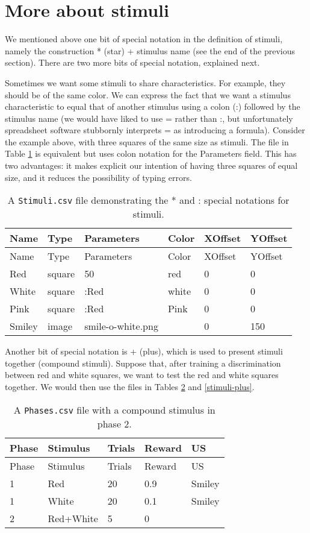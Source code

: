 \documentclass[11pt,]{article}
\begin{document}
\section{More about stimuli}\label{more-about-stimuli}

We mentioned above one bit of special notation in the definition of
stimuli, namely the construction * (star) + stimulus name (see the end
of the previous section). There are two more bits of special notation,
explained next.

Sometimes we want some stimuli to share characteristics. For example,
they should be of the same color. We can express the fact that we want a
stimulus characteristic to equal that of another stimulus using a colon
(:) followed by the stimulus name (we would have liked to use = rather
than :, but unfortunately spreadsheet software stubbornly interprets =
as introducing a formula). Consider the example above, with three
squares of the same size as stimuli. The file in Table
\ref{stimuli-special} is equivalent but uses colon notation for the
Parameters field. This has two advantages: it makes explicit our
intention of having three squares of equal size, and it reduces the
possibility of typing errors.

\begin{longtable}[c]{@{}llllll@{}}
\caption{A \texttt{Stimuli.csv} file demonstrating the * and : special
notations for stimuli. \label{stimuli-special}}\tabularnewline
\toprule
Name & Type & Parameters & Color & XOffset & YOffset\tabularnewline
\midrule
\endfirsthead
\toprule
Name & Type & Parameters & Color & XOffset & YOffset\tabularnewline
\midrule
\endhead
Red & square & 50 & red & 0 & 0\tabularnewline
White & square & :Red & white & 0 & 0\tabularnewline
Pink & square & :Red & Pink & 0 & 0\tabularnewline
Smiley & image & smile-o-white.png & & 0 & 150\tabularnewline
\bottomrule
\end{longtable}

Another bit of special notation is + (plus), which is used to present
stimuli together (compound stimuli). Suppose that, after training a
discrimination between red and white squares, we want to test the red
and white squares together. We would then use the files in Tables
\ref{phases-plus} and \ref{stimuli-plus}.

\begin{longtable}[c]{@{}lllll@{}}
\caption{A \texttt{Phases.csv} file with a compound stimulus in phase 2.
\label{phases-plus}}\tabularnewline
\toprule
Phase & Stimulus & Trials & Reward & US\tabularnewline
\midrule
\endfirsthead
\toprule
Phase & Stimulus & Trials & Reward & US\tabularnewline
\midrule
\endhead
1 & Red & 20 & 0.9 & Smiley\tabularnewline
1 & White & 20 & 0.1 & Smiley\tabularnewline
2 & Red+White & 5 & 0 &\tabularnewline
\bottomrule
\end{longtable}
\end{document}

